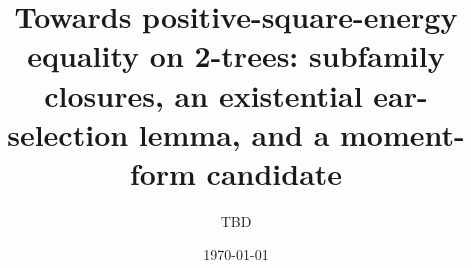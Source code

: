 \documentclass[11pt,reqno]{amsart}
\title[Square energy on 2-trees]{Towards positive-square-energy equality on
2-trees: subfamily closures, an existential ear-selection lemma, and a
moment-form candidate}
\author{TBD}
\date{\today}
\begin{document}
\begin{abstract}

\end{abstract}

\maketitle











\appendix






\end{document}
